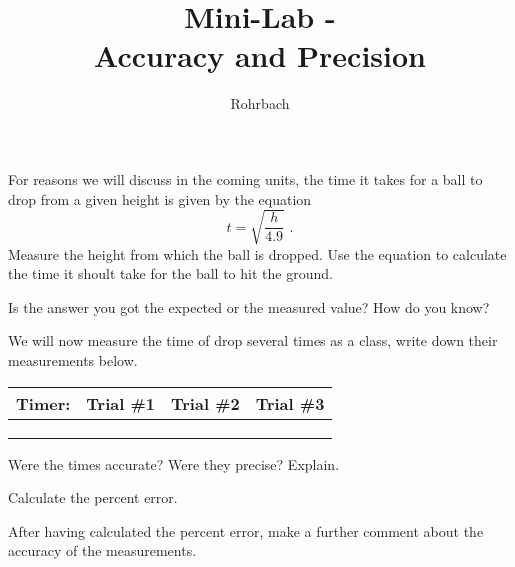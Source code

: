 \documentclass[10pt]{exam}
\title{Mini-Lab - \\ Accuracy and Precision}
\author{Rohrbach}
\begin{document}
\maketitle

\begin{questions}

  \question
    For reasons we will discuss in the coming units, the 
    time it takes for a ball to drop from a given height is
    given by the equation
    \begin{equation*}
      t = \sqrt{\frac{h}{4.9}}\,\, .
    \end{equation*}
    Measure the height from which the ball is dropped.  Use the equation to calculate the time it shoult take for the ball to hit the ground.



  \question
    Is the answer you got the expected or the measured value? How do you know?


  \question
    We will now measure the time of drop several times as a class, write down their measurements below.
    \begin{center}
    \begin{tabular}[c]
      {|m{10em}|w{c}{5em}|w{c}{5em}|w{c}{5em}|}
      \hline
      Timer: & Trial \#1 & Trial \#2 & Trial \#3 \\
      \hline
             &           &           &           \\[2em]
      \hline
             &           &           &           \\[2em]
      \hline
             &           &           &           \\[2em]
      \hline
    \end{tabular}
    \end{center}

  \question
    Were the times accurate?  Were they precise?
    Explain.


  \question
    Calculate the percent error.


  \question
    After having calculated the percent error, make 
    a further comment about the accuracy of the
    measurements.


\end{questions}
\end{document}
